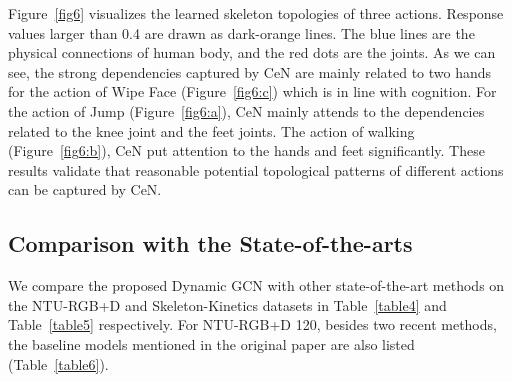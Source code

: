 \documentclass[sigconf]{acmart}
\begin{document}
Figure~\ref{fig6} visualizes the learned skeleton topologies of three actions. Response values larger than 0.4 are drawn as dark-orange lines. The blue lines are the physical connections of human body, and the red dots are the joints. As we can see, the strong dependencies captured by CeN are mainly related to two hands for the action of Wipe Face (Figure~\ref{fig6:c}) which is in line with cognition. For the action of Jump (Figure~\ref{fig6:a}), CeN mainly attends to the dependencies related to the knee joint and the feet joints. The action of walking (Figure~\ref{fig6:b}), CeN put attention to the hands and feet significantly. These results validate that reasonable potential topological patterns of different actions can be captured by CeN.

\subsection{Comparison with the State-of-the-arts}
We compare the proposed Dynamic GCN with other state-of-the-art methods on the NTU-RGB+D and Skeleton-Kinetics datasets in Table~\ref{table4} and Table~\ref{table5} respectively. For NTU-RGB+D 120, besides two recent methods, the baseline models mentioned in the original paper are also listed (Table~\ref{table6}).
\end{document}
